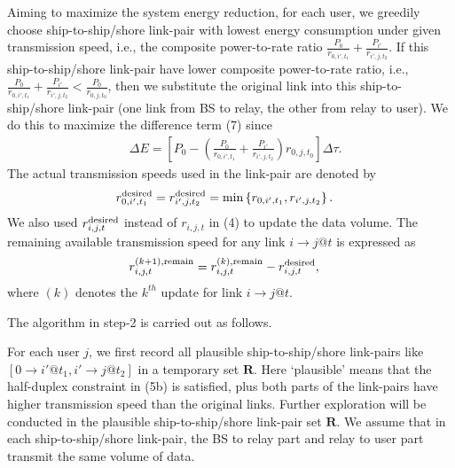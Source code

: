 \documentclass[conference]{IEEEtran}
\begin{document}
 Aiming to maximize the system energy reduction, for each user, we greedily choose ship-to-ship/shore link-pair with lowest energy consumption under given transmission speed, i.e., the composite power-to-rate ratio $ {\frac{{{P_0}}}{{{r_{0,i',{t_1}}}}} + \frac{{{P_{i'}}}}{{{r_{i',j,{t_2}}}}}} $. If this ship-to-ship/shore link-pair have lower composite power-to-rate ratio, i.e., $ {\frac{{{P_0}}}{{{r_{0,i',{t_1}}}}} + \frac{{{P_{i'}}}}{{{r_{i',j,{t_2}}}}}} < \frac{{{P_0}}}{{{r_{0,j,{t_0}}}}}$, then we substitute the original link into this ship-to-ship/shore link-pair (one link from BS to relay, the other from relay to user). We do this to maximize the difference term (7) since 
 \begin{align}
   &\Delta E  = \left[ {P_0}- \left( {\frac{{{P_0}}}{{{r_{0,i',{t_1}}}}} + \frac{{{P_{i'}}}}{{{r_{i',j,{t_2}}}}}} \right){r_{0,j,{t_0}}} \right] \Delta \tau.
 \end{align}
The actual transmission speeds used in the link-pair are denoted by 
\begin{align}
&r_{0,i',{t_1}}^{\rm{desired}}=r_{i',j,{t_2}}^{\rm{desired}}=\min \left\{ r_{0,i',{t_1}},r_{i',j,{t_2}} \right\}. 
\end{align}
We also used $r_{i,j,{t}}^{\rm{desired}}$ instead of $r_{i,j,{t}}$ in (4) to update the data volume. 
The remaining available transmission speed for any link $i \to j @ t$ is expressed as
\begin{align}
 &r_{i,j,{t}}^{\left( k+1 \right),\rm{remain}} = r_{i,j,{t}}^{\left( k \right),\rm{remain}} - r_{i,j,{t}}^{\rm{desired}}, 
\end{align}
where $\left( k \right)$ denotes the $k^{th}$ update for link $i \to j @ t$. 

 The algorithm in step-2 is carried out as follows.
 
 For each user $j$, we first record all plausible ship-to-ship/shore link-pairs like $\left[ {0 \to i'@{t_1},i' \to j@{t_2}} \right]$ in a temporary set $\mathbf{R}$. Here `plausible' means that the half-duplex constraint in (5b) 
 is satisfied, plus both parts of the link-pairs have higher transmission speed than the original links. Further exploration will be conducted in the plausible ship-to-ship/shore link-pair set $\mathbf{R}$. We assume that in each ship-to-ship/shore link-pair, the BS to relay part and relay to user part transmit the same volume of data.
\end{document}
